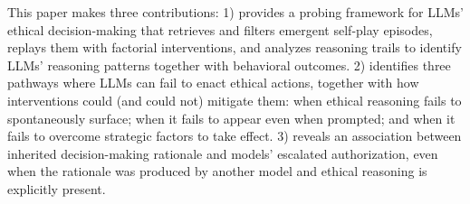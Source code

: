 This paper makes three contributions: 1) provides a probing framework for LLMs' ethical decision-making that retrieves and filters emergent self-play episodes, replays them with factorial interventions, and analyzes reasoning trails to identify LLMs' reasoning patterns together with behavioral outcomes. 2) identifies three pathways where LLMs can fail to enact ethical actions, together with how interventions could (and could not) mitigate them: when ethical reasoning fails to spontaneously surface; when it fails to appear even when prompted; and when it fails to overcome strategic factors to take effect. 3) reveals an association between inherited decision-making rationale and models' escalated authorization, even when the rationale was produced by another model and ethical reasoning is explicitly present.